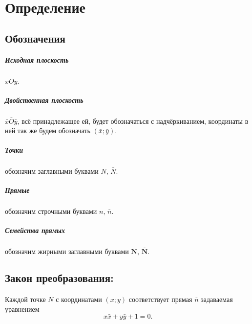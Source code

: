 \section{Определение}


\subsection{Обозначения}
\subparagraph{Исходная плоскость} $xOy$.
\subparagraph{Двойственная плоскость} $\bar{x}\bar{O}\bar{y}$, всё принадлежащее ей, будет обозначаться с надчёркиванием, координаты в ней так же будем обозначать $(\bar{x}; \bar{y})$.
\subparagraph{Точки} обозначим заглавными буквами $N$, $\bar{N}$.
\subparagraph{Прямые} обозначим строчными буквами $n$, $\bar{n}$.
\subparagraph{Семейства прямых} обозначим жирными заглавными буквами $\mathbf{N}$, $\mathbf{\bar{N}}$.

\subsection{Закон преобразования:}
\paragraph{}Каждой точке $N$ с координатами $(x; y)$ соответствует прямая $\bar{n}$ задаваемая уравнением 
$$x\bar{x} + y\bar{y} + 1 = 0.$$